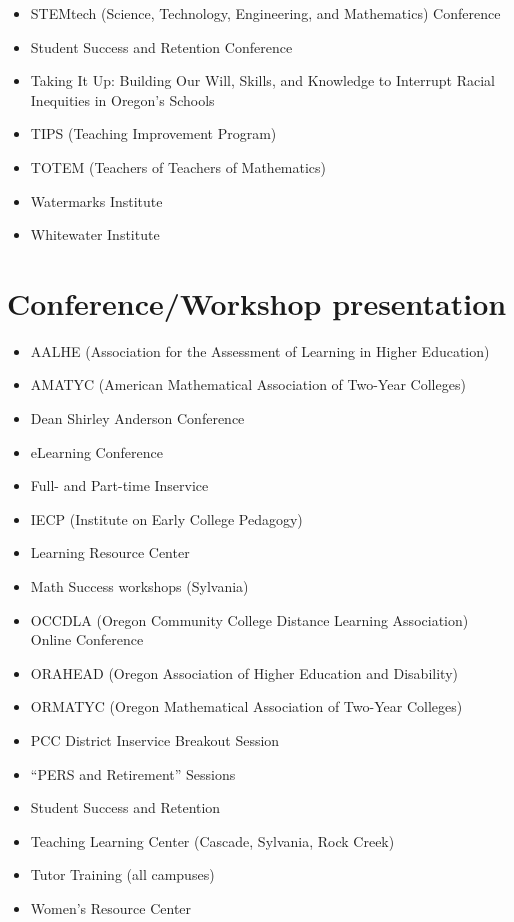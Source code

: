 \begin{itemize}[label={}]
\item STEMtech (Science, Technology, Engineering, and Mathematics) Conference
\item Student Success and Retention Conference
\item Taking It Up:  Building Our Will, Skills, and Knowledge to Interrupt Racial Inequities in Oregon's Schools
\item TIPS (Teaching Improvement Program)
\item TOTEM (Teachers of Teachers of Mathematics)
\item Watermarks Institute
\item Whitewater Institute
\end{itemize}

\section*{Conference/Workshop presentation}

\begin{itemize}[label={}]
\item AALHE (Association for the Assessment of Learning in Higher Education)
\item AMATYC (American Mathematical Association of Two-Year Colleges)
\item Dean Shirley Anderson Conference
\item eLearning Conference
\item Full- and Part-time Inservice
\item IECP (Institute on Early College Pedagogy)
\item Learning Resource Center
\item Math Success workshops (Sylvania)
\item OCCDLA (Oregon Community College Distance Learning Association) Online Conference
\item ORAHEAD (Oregon Association of Higher Education and Disability)
\item ORMATYC (Oregon Mathematical Association of Two-Year Colleges)
\item PCC District Inservice Breakout Session
\item ``PERS and Retirement'' Sessions
\item Student Success and Retention
\item Teaching Learning Center (Cascade, Sylvania, Rock Creek)
\item Tutor Training (all campuses)
\item Women's Resource Center
\end{itemize}

